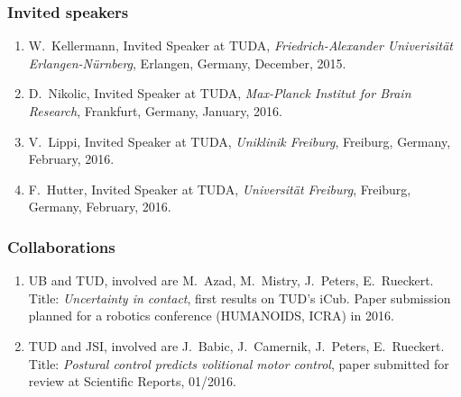 

\subsubsection{Invited speakers}%
\begin{enumerate}
	\item W.~Kellermann, Invited Speaker at TUDA, \emph{Friedrich-Alexander Univerisit\"at Erlangen-N\"urnberg}, Erlangen, Germany, December, 2015.
	\item D.~Nikolic, Invited Speaker at TUDA, \emph{Max-Planck Institut for Brain Research}, Frankfurt, Germany, January, 2016.
	\item V.~Lippi, Invited Speaker at TUDA, \emph{Uniklinik Freiburg}, Freiburg, Germany, February, 2016.
	\item F.~Hutter, Invited Speaker at TUDA, \emph{Universit\"at Freiburg}, Freiburg, Germany, February, 2016.
\end{enumerate}

\subsubsection{Collaborations}

\begin{enumerate}%
	\item UB and TUD, involved are M.~Azad, M.~Mistry, J.~Peters, E.~Rueckert. Title: \emph{Uncertainty in contact}, first results on TUD's iCub. Paper submission planned for a robotics conference (HUMANOIDS, ICRA) in 2016. 
	\item TUD and JSI, involved are J.~Babic, J.~Camernik, J.~Peters, E.~Rueckert. Title: \emph{Postural control predicts volitional motor control}, paper submitted for review at Scientific Reports, 01/2016.
\end{enumerate}